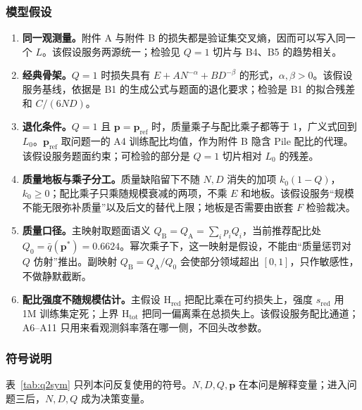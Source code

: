\subsubsection{模型假设}

\begin{enumerate}[label=\arabic*.,leftmargin=2.2em]
\item \textbf{同一观测量。}附件 A 与附件 B 的损失都是验证集交叉熵，因而可以写入同一个 $L$。该假设服务两源统一；检验见 $Q=1$ 切片与 B4、B5 的趋势相关。
\item \textbf{经典骨架。}$Q=1$ 时损失具有 $E+AN^{-\alpha}+BD^{-\beta}$ 的形式，$\alpha,\beta>0$。该假设服务基线，依据是 B1 的生成公式与题面的退化要求；检验是 B1 的拟合残差和 $C/(6ND)$。
\item \textbf{退化条件。}$Q=1$ 且 $\mathbf{p}=\mathbf{p}_{\mathrm{ref}}$ 时，质量乘子与配比乘子都等于 1，广义式回到 $L_0$。$\mathbf{p}_{\mathrm{ref}}$ 取问题一的 A4 训练配比均值，作为附件 B 隐含 Pile 配比的代理。该假设服务题面约束；可检验的部分是 $Q=1$ 切片相对 $L_0$ 的残差。
\item \textbf{质量地板与乘子分工。}质量缺陷留下不随 $N,D$ 消失的加项 $k_0(1-Q)$，$k_0\ge 0$；配比乘子只乘随规模衰减的两项，不乘 $E$ 和地板。该假设服务“规模不能无限弥补质量”以及后文的替代上限；地板是否需要由嵌套 $F$ 检验裁决。
\item \textbf{质量口径。}主映射取题面语义 $Q_{\mathrm B}=Q_{\mathrm A}=\sum_i p_i Q_i$，当前推荐配比处 $Q_0=\bar q(\mathbf{p}^*)=0.6624$。幂次乘子下，这一映射是假设，不能由“质量惩罚对 $Q$ 仿射”推出。副映射 $Q_{\mathrm B}=Q_{\mathrm A}/Q_0$ 会使部分领域超出 $[0,1]$，只作敏感性，不做静默截断。
\item \textbf{配比强度不随规模估计。}主假设 H$_{\mathrm{red}}$ 把配比乘在可约损失上，强度 $s_{\mathrm{red}}$ 用 1M 训练集定死；上界 H$_{\mathrm{tot}}$ 把同一偏离乘在总损失上。该假设服务配比通道；A6--A11 只用来看观测斜率落在哪一侧，不回头改参数。
\end{enumerate}

\subsubsection{符号说明}

表~\ref{tab:q2sym} 只列本问反复使用的符号。$N,D,Q,\mathbf{p}$ 在本问是解释变量；进入问题三后，$N,D,Q$ 成为决策变量。


